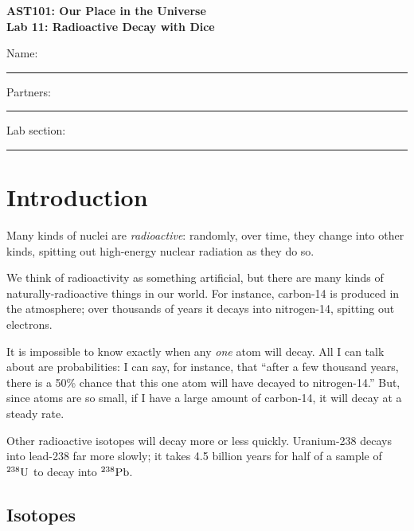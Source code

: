 \documentclass[11pt]{article}
\begin{document}
\begin{center}
\textbf{\Large
AST101: Our Place in the Universe \\
\vspace*{0.1cm}
Lab 11: Radioactive Decay with Dice 
}
\end{center}

\vspace*{0.5cm}

{\Large Name:}\vspace*{0.5cm}\\\hrule
{\Large Partners:}\vspace*{0.5cm}\\\hrule
{\Large Lab section:}\vspace*{0.5cm}\\\hrule
\vspace*{0.5cm}

\section{Introduction}

Many kinds of nuclei are {\it radioactive}: randomly, over time, they change into other kinds, spitting out high-energy nuclear radiation as they do so.

We think of radioactivity as something artificial, but there are many kinds of naturally-radioactive things in our world. For instance, carbon-14 is produced in the atmosphere; over thousands of years it decays into nitrogen-14, spitting out electrons.

It is impossible to know exactly when any {\it one} atom will decay. All I can talk about are probabilities: I can say, for instance, that ``after a few thousand years, there is a 50\% chance that this one atom will have decayed to nitrogen-14.'' 
But, since atoms are so small, if I have a large amount of carbon-14, it will decay at a steady rate.

Other radioactive isotopes will decay more or less quickly. Uranium-238 decays into lead-238 far more slowly; it takes 4.5 billion years for half of a sample of ${}^{238}\rm U$ to decay into ${}^{238}\rm Pb$. 

\subsection{Isotopes}
\end{document}
